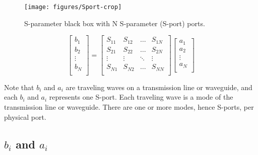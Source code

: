 \documentclass[titlepage]{article}
\renewcommand\_{\textunderscore\linebreak[1]}
\begin{document}
\begin{figure}
  \centering
  \texttt{[image: figures/Sport-crop]}
  \caption{S-parameter black box with N S-parameter (S-port) ports.}
  \label{fig:Sport}
\end{figure}

\begin{equation}
\label{eq:Sparameters}
\left[ \begin{array}{c}
  b_1 \\
  b_2 \\
  \vdots \\
  b_N \\
\end{array} \right] = 
\left[ \begin{array}{cccc}
  S_{11} & S_{12} & \ldots & S_{1N} \\
  S_{21} & S_{22} & \ldots & S_{2N} \\
  \vdots & \vdots & \ddots & \vdots \\
  S_{N1} & S_{N2} & \ldots & S_{NN} \\
\end{array} \right]  
\left[ \begin{array}{c}
  a_1 \\
  a_2 \\
  \vdots \\
  a_N  \\
\end{array} \right]
\end{equation}

Note that $b_i$ and $a_i$ are traveling waves on a transmission line or waveguide, and each $b_i$ and $a_i$ represents one S-port.  Each traveling wave is a mode of the transmission line or waveguide.  There are one or more modes, hence S-ports, per physical port.

\subsection{$b_i$ and $a_i$}
\end{document}
